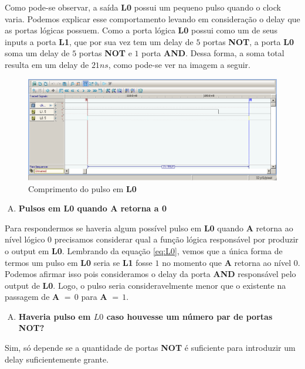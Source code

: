 \documentclass[12pt]{article}
\begin{document}
Como pode-se observar, a saída \textbf{L0} possui um pequeno pulso quando o
clock varia. Podemos explicar esse comportamento levando em consideração o delay
que as portas lógicas possuem. Como a porta lógica \textbf{L0} possui como um de
seus inputs a porta \textbf{L1}, que por sua vez tem um delay de $5$ portas
\textbf{NOT}, a porta \textbf{L0} soma um delay de $5$ portas \textbf{NOT} e $1$
porta \textbf{AND}. Dessa forma, a soma total resulta em um delay de $21ns$,
como pode-se ver na imagem a seguir.

\begin{figure}[H]
    \centering
    \includegraphics[width=.9\textwidth]{Exp04/exp4_2.0_c_clk_wave_lenght.png}
    \caption{Comprimento do pulso em \textbf{L0}}\label{fig:exp4_2.0_c_clk_wave_lenght.png}
\end{figure}

\begin{enumerate}[D)]
\item \textbf{Pulsos em L0 quando A retorna a 0}
\end{enumerate}

Para respondermos se haveria algum possível pulso em \textbf{L0} quando
\textbf{A} retorna ao nível lógico $0$ precisamos considerar qual a função
lógica responsável por produzir o output em \textbf{L0}. Lembrando da equação
\ref{eq:L0}, vemos que a única forma de termos um pulso em \textbf{L0} seria se
\textbf{L1} fosse $1$ no momento que \textbf{A} retorna ao nível $0$. Podemos
afirmar isso pois consideramos o delay da porta \textbf{AND} responsável pelo
output de \textbf{L0}. Logo, o pulso seria consideravelmente menor que o
existente na passagem de \textbf{A} $= \, 0$ para \textbf{A} $= \, 1$.

\begin{enumerate}[E)]
\item \textbf{Haveria pulso em \(L0\) caso houvesse um número par de portas \textbf{NOT}?}
\end{enumerate}

Sim, só depende se a quantidade de portas \textbf{NOT} é suficiente para
introduzir um delay suficientemente grante.
\end{document}
